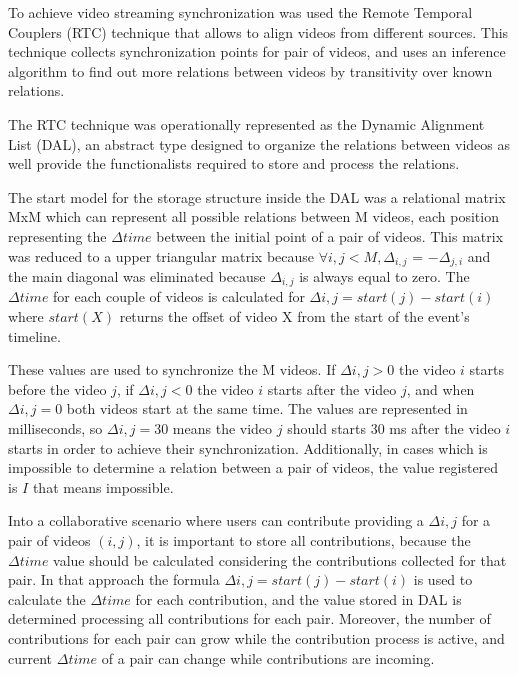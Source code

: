 
To achieve video streaming synchronization was used the Remote Temporal Couplers (RTC) technique \cite{segundo2015remote} that allows to align videos from different sources. This technique collects synchronization points for pair of videos, and uses an inference algorithm to find out more relations between videos by transitivity over known relations.






The RTC technique was operationally represented as the Dynamic Alignment List (DAL), an abstract type designed to organize the relations between videos as well provide the functionalists required to store and process the relations.

The start model for the storage structure inside the DAL was a relational matrix MxM which can represent all possible relations between M videos, each position representing the $\Delta{time}$ between the initial point of a pair of videos. This matrix was reduced to a upper triangular matrix because $\forall{i,j} < M , \Delta_{i,j}$ = $- \Delta_{j,i}$ and the main diagonal was eliminated because $\Delta_{i,j}$ is always equal to zero. The $\Delta{time}$ for each couple of videos is calculated for $\Delta{i,j} = start(j) - start(i)$ where $start(X)$ returns the offset of video X from the start of the event's timeline.

These values are used to synchronize the M videos. If $\Delta{i,j} > 0$ the video $i$ starts before the video $j$, if $\Delta{i,j} < 0$ the video $i$ starts after the video $j$, and when $\Delta{i,j} = 0$ both videos start at the same time. The values are represented in milliseconds, so $\Delta{i,j} = 30$ means the video $j$ should starts 30 ms after the video $i$ starts in order to achieve their synchronization. Additionally, in cases which is impossible to determine a relation between a pair of videos, the value registered is $I$ that means impossible.

Into a collaborative scenario where users can contribute providing a $\Delta{i,j}$ for a pair of videos $(i,j)$, it is important to store all contributions, because the $\Delta{time}$ value should be calculated considering the contributions collected for that pair. In that approach the formula $\Delta{i,j} = start(j) - start(i)$  is used to calculate the $\Delta{time}$ for each contribution, and the value stored in DAL is determined processing all contributions for each pair. Moreover, the number of contributions for each pair can grow while the contribution process is active, and current $\Delta{time}$ of a pair can change while contributions are incoming.

